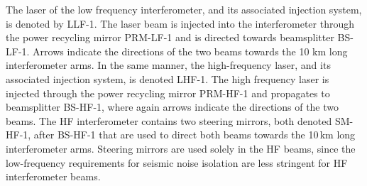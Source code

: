 The laser of the low frequency interferometer, and its associated injection system, is denoted by LLF-1. The laser beam is injected into the interferometer through the power recycling mirror PRM-LF-1 and is directed towards beamsplitter BS-LF-1. Arrows indicate the directions of the two beams towards the 10 km long interferometer arms. In the same manner, the high-frequency laser, and its associated injection system, is denoted LHF-1. The high frequency laser is injected through the power recycling mirror PRM-HF-1 and propagates to beamsplitter BS-HF-1, where again arrows indicate the directions of the two beams. The HF interferometer contains two steering mirrors, both denoted SM-HF-1, after BS-HF-1 that are used to direct both beams towards the 10\,km long interferometer arms. Steering mirrors are used solely in the HF beams, since the low-frequency requirements for seismic noise isolation are less stringent for HF interferometer beams. 

